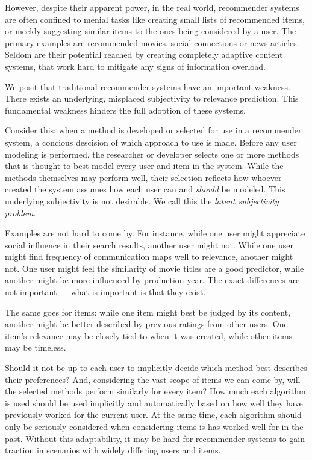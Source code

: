 However, despite their apparent power, in the real world, recommender systems are often confined
to menial tasks like creating small lists of recommended items, 
or meekly suggesting similar items to the ones being considered by a user.
The primary examples are recommended movies, social connections or news articles.
Seldom are their potential reached by creating completely adaptive
content systems, that work hard to mitigate any signs of information overload.

We posit that traditional recommender systems have an important weakness.
There exists an underlying, misplaced subjectivity to relevance prediction.
This fundamental weakness hinders the full adoption of these systems.

Consider this: 
when a method is developed or selected for use in a recommender system,
a concious descision of which approach to use is made.
Before any user modeling is performed, the researcher or developer selects
one or more methods that is thought to best model every user and item in the system.
While the methods themselves may perform well, their selection
reflects how whoever created the system assumes how each user
can and \emph{should} be modeled. This underlying subjectivity is not desirable.
We call this the \emph{latent subjectivity problem}.

Examples are not hard to come by.
For instance, while one user might appreciate social
influence in their search results, another user might not.
While one user might find frequency of communication maps well to relevance,
another might not. 
One user might feel the similarity of movie titles are a good predictor,
while another might be more influenced by production year.
The exact differences are not important --- what is important is that they exist.

The same goes for items: while one item might best be judged by its content,
another might be better described by previous ratings from other users.
One item's relevance may be closely tied to when it was created,
while other items may be timeless.

Should it not be up to each user to implicitly decide which method best describes their preferences?
And, considering the vast scope of items we can come by, will the selected
methods perform similarly for every item?
How much each algorithm is used should be used implicitly and automatically
based on how well they have previously worked for the current user.
At the same time, each algorithm should only be seriously considered
when considering items is has worked well for in the past.
Without this adaptability, it may be hard for recommender systems
to gain traction in scenarios with widely differing users and items.

